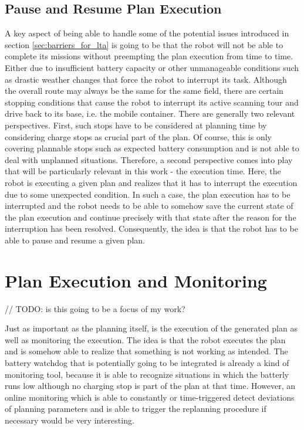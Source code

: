 \documentclass[german, master, expose, latin1]{base/thesis_KBS}
\begin{document}
\subsection{Pause and Resume Plan Execution}

A key aspect of being able to handle some of the potential issues introduced in section \ref{sec:barriers_for_lta} is going to be that the robot will not be able to
complete its missions without preempting the plan execution from time to time. Either due to insufficient battery capacity or other unmanageable conditions such as 
drastic weather changes that force the robot to interrupt its task. Although the overall route may always be the same for the same field, there are certain stopping
conditions that cause the robot to interrupt its active scanning tour and drive back to its base, i.e. the mobile container.
There are generally two relevant perspectives. First, such stops have to be considered at planning time by considering charge stops as crucial part of the plan.
Of course, this is only covering plannable stops such as expected battery consumption and is not able to deal with unplanned situations.
Therefore, a second perspective comes into play that will be particularly relevant in this work - the execution time. Here, the robot is executing a given plan and
realizes that it has to interrupt the execution due to some unexpected condition. In such a case, the plan execution has to be interrupted and the robot needs to be 
able to somehow save the current state of the plan execution and continue precisely with that state after the reason for the interruption has been resolved.
Consequently, the idea is that the robot has to be able to pause and resume a given plan.

\section{Plan Execution and Monitoring}

// TODO: is this going to be a focus of my work?\newline

Just as important as the planning itself, is the execution of the generated plan as well as monitoring the execution.
The idea is that the robot executes the plan and is somehow able to realize that something is not working as intended. 
The battery watchdog that is potentially going to be integrated is already a kind of monitoring tool, because it is able to recognize situations 
in which the batterly runs low although no charging stop is part of the plan at that time. However, an online monitoring which is able to constantly or time-triggered 
detect deviations of planning parameters and is able to trigger the replanning procedure if necessary would be very interesting.\newline
\end{document}
